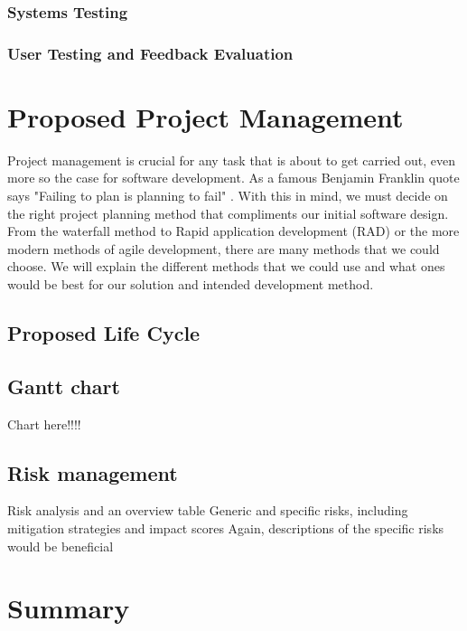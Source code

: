 \documentclass[a4paper,10pt]{article}
\begin{document}
\subsubsection{Systems Testing}

\subsubsection{User Testing and Feedback Evaluation}



\section{Proposed Project Management}
Project management is crucial for any task that is about to get carried out, even more so the case for software development. As a famous Benjamin Franklin quote says "Failing to plan is planning to fail"  \cite{plan_to_fail}. With this in mind, we must decide on the right project planning method that compliments our initial software design. From the waterfall method to Rapid application development (RAD) or the more modern methods of agile development, there are many methods that we could choose. We will explain the different methods that we could use and what ones would be best for our solution and intended development method.

\subsection{Proposed Life Cycle}


\begin{landscape}
\subsection{Gantt chart}
	Chart here!!!!
\end{landscape}


\subsection{Risk management}
Risk analysis and an overview table
Generic and specific risks, including mitigation strategies and impact scores
Again, descriptions of the specific risks would be beneficial

\section{Summary}
\end{document}
